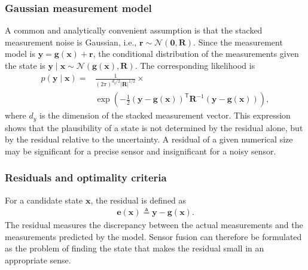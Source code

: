 \documentclass{ieeeaccess}
\begin{document}
\subsubsection{Gaussian measurement model}
A common and analytically convenient assumption is that the stacked measurement noise is Gaussian, i.e., $\mathbf{r} \sim \mathcal{N} \left( \mathbf{0}, \mathbf{R} \right)$. Since the measurement model is $\mathbf{y}=\mathbf{g}(\mathbf{x})+\mathbf{r}$, the conditional distribution of the measurements given the state is $\mathbf{y}\mid\mathbf{x} \sim \mathcal{N} \left( \mathbf{g}(\mathbf{x}), \mathbf{R} \right)$. 
The corresponding likelihood is
\begin{align}
\label{eq:Gaussianlikelihood}
p(\mathbf{y}\mid\mathbf{x}) =& \frac{1} {(2\pi)^{d_y/2}|\mathbf{R}|^{1/2}}\times  \\ 
&\exp \left( - \frac{1}{2} \left( \mathbf{y}-\mathbf{g}(\mathbf{x})\right)^{\mathsf T}\mathbf{R}^{-1}\left(\mathbf{y}-\mathbf{g}(\mathbf{x})\right)\right), \nonumber
\end{align}
where $d_y$ is the dimension of the stacked measurement vector. This expression shows that the plausibility of a state is not determined by the residual alone, but by the residual relative to the uncertainty. A residual of a given numerical size may be significant for a precise sensor and insignificant for a noisy sensor.

\subsubsection{Residuals and optimality criteria}
For a candidate state $\mathbf{x}$, the residual is defined as
\begin{align}
\mathbf{e}(\mathbf{x}) \triangleq \mathbf{y} - \mathbf{g}(\mathbf{x}).
\end{align}
The residual measures the discrepancy between the actual measurements and the measurements predicted by the model. Sensor fusion can therefore be formulated as the problem of finding the state that makes the residual small in an appropriate sense.
\end{document}
